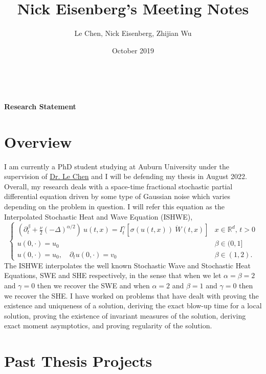 \documentclass[a4paper,11pt]{article}
\title{Nick Eisenberg's Meeting Notes}
\author{Le Chen, Nick Eisenberg, Zhijian Wu}
\date{October 2019}
\numberwithin{equation}{section}
\theoremstyle{plain}
\theoremstyle{definition}
\newcommand{\R}{\mathbb{R}}
\numberwithin{NQ}{section}
\numberwithin{LQ}{section}
\numberwithin{ZQ}{section}
\begin{document}
\thispagestyle{fancy}
\fancyhf{}
$\;$
	\begin{center}	
		\huge{\textbf{Research Statement}}
	\end{center}

\section{Overview} I am currently a PhD student studying at Auburn University under the supervision of \href{http://webhome.auburn.edu/~lzc0090/}{Dr. Le Chen} and I will be defending my thesis in August 2022. Overall, my research deals with a space-time fractional stochastic partial differential equation driven by some type of Gaussian noise which varies depending on the problem in question. I will refer this equation as the Interpolated Stochastic Heat and Wave Equation (ISHWE),
	\begin{equation}
	\label{E:ISHWE}
		\begin{cases}
		\left(\partial^\beta_t + \frac{\nu}{2}(-\Delta)^{\alpha/2}\right)\: u(t,x) = I^\gamma_t \left[\sigma( u(t,x)) \: \dot W(t,x) \right] & \text{$x\in \R^d$, $t>0$} \\
		u(0,\cdot) = u_0                                                                                                            & \beta \in (0,1]               \\
		u(0,\cdot) = u_0, \quad \partial_t u(0,\cdot) = v_0                                                                            & \beta \in (1,2).
		\end{cases}
	\end{equation}
The ISHWE interpolates the well known Stochastic Wave and Stochastic Heat Equations, SWE and SHE respectively, in the sense that when we let $\alpha = \beta =2$ and $\gamma =0$ then we recover the SWE and when $\alpha =2$ and $\beta=1$ and $\gamma =0$ then we recover the SHE. I have worked on problems that have dealt with proving the existence and uniqueness of a solution, deriving the exact blow-up time for a local solution, proving the existence of invariant measures of the solution, deriving exact moment asymptotics, and proving regularity of the solution.   

\section{Past Thesis Projects}
\end{document}
